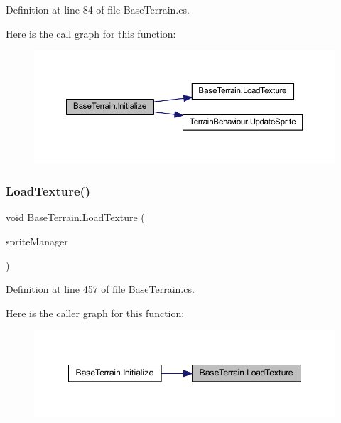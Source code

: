 Definition at line 84 of file Base\+Terrain.\+cs.

Here is the call graph for this function\+:
\nopagebreak
\begin{figure}[H]
\begin{center}
\leavevmode
\includegraphics[width=350pt]{class_base_terrain_aff9e343986e2b76d0fc22be3a5e246dc_cgraph}
\end{center}
\end{figure}
\mbox{\label{class_base_terrain_ada3cddbd511be2890cbb9635d997441b}} 
\subsubsection{\texorpdfstring{LoadTexture()}{LoadTexture()}}
{\footnotesize\ttfamily void Base\+Terrain.\+Load\+Texture (\begin{DoxyParamCaption}\item[{\mbox{\hyperlink{class_sprite_manager}{Sprite\+Manager}}}]{sprite\+Manager }\end{DoxyParamCaption})}



Definition at line 457 of file Base\+Terrain.\+cs.

Here is the caller graph for this function\+:
\nopagebreak
\begin{figure}[H]
\begin{center}
\leavevmode
\includegraphics[width=348pt]{class_base_terrain_ada3cddbd511be2890cbb9635d997441b_icgraph}
\end{center}
\end{figure}
\mbox{\label{class_base_terrain_abda1c3ac02dc72095eb8c50ef68f8a2e}} 
